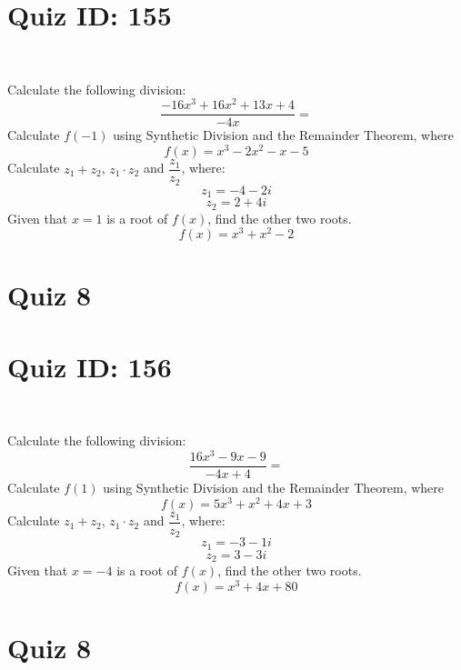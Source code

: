 \documentclass{exam}
\begin{document}
\section*{Quiz ID: 155}
\vspace{0.5cm}\
\vspace{1cm}\
\begin{questions}
\question Calculate the following division:\[\dfrac{
-16x^3 + 16x^2 + 13x + 4}{
-4x}=\] \makeemptybox{\stretch{2}}
\question Calculate $f(-1)$ using Synthetic Division and the Remainder Theorem, where\[f(x) = 
x^3 - 2x^2 - x - 5\]
\newpage\question Calculate $z_1+z_2$, $z_1\cdot z_2$ and $\dfrac{z_1}{z_2}$, where:\[z_1=-4-2\mathit{i}\]\[z_2=2+4\mathit{i}\]
\question Given that $x=1$ is a root of $f(x)$, find the other two roots.\[f(x)=
x^3 + x^2 - 2\]\makeemptybox{\stretch{1}}
\end{questions}\newpage
\newpage
\section*{Quiz 8}
\section*{Quiz ID: 156}
\vspace{0.5cm}\
\vspace{1cm}\
\begin{questions}
\question Calculate the following division:\[\dfrac{
16x^3 - 9x - 9}{
-4x + 4}=\] 
\question Calculate $f(1)$ using Synthetic Division and the Remainder Theorem, where\[f(x) = 
5x^3 + x^2 + 4x + 3\]
\newpage\question Calculate $z_1+z_2$, $z_1\cdot z_2$ and $\dfrac{z_1}{z_2}$, where:\[z_1=-3-1\mathit{i}\]\[z_2=3-3\mathit{i}\]\makeemptybox{\stretch{1}}
\question Given that $x=-4$ is a root of $f(x)$, find the other two roots.\[f(x)=
x^3 + 4x + 80\]\makeemptybox{\stretch{1}}
\end{questions}\newpage
\newpage
\section*{Quiz 8}
\end{document}

